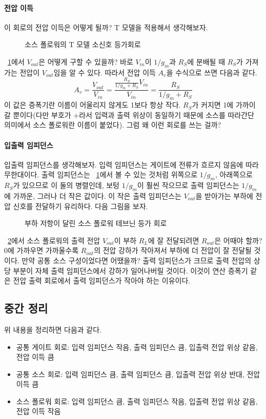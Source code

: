 \paragraph{전압 이득}
이 회로의 전압 이득은 어떻게 될까? T 모델을 적용해서 생각해보자.
\begin{figure}[!hbp]
    \centering
    \caption{소스 폴로워의 T 모델 소신호 등가회로}\label{fig:src follower eq circuit}
\end{figure}
\figurename~\ref{fig:src follower eq circuit}에서 $V_{out}$은 어떻게 구할 수 있을까? 바로 $V_{in}$이 $1/g_m$과 $R_S$에 분배될 때 $R_S$가 가져가는 전압이 $V_{out}$임을 알 수 있다.
따라서 전압 이득 $A_v$을 수식으로 쓰면 다음과 같다.
\begin{equation}
    A_v=\frac{V_{out}}{V_{in}}=\frac{\frac{R_S}{1/g_m+R_S}V_{in}}{V_{in}}=\frac{R_S}{1/g_m+R_S}
\end{equation}
이 값은 증폭기란 이름이 어울리지 않게도 1보다 항상 작다. $R_S$가 커지면 1에 가까이 갈 뿐이다(다만 부호가 +라서 입력과 출력 위상이 동일하기 때문에 소스를 따라간단 의미에서 소스 폴로워란 이름이 붙었다).
그럼 왜 이런 회로를 쓰는 걸까?
\paragraph{입출력 임피던스}
입출력 임피던스를 생각해보자. 입력 임피던스는 게이트에 전류가 흐르지 않음에 따라 무한대이다. 출력 임피던스는 \figurename~\ref{fig:src follower eq circuit}에서 볼 수 있는 것처럼 위쪽으로 $1/g_m$, 아래쪽으로 $R_S$가 있으므로 이 둘의 병렬인데, 보텅 $1/g_m$이 훨씬 작으므로 출력 임피던스는 $1/g_m$에 가까운, 그러나 더 작은 값이다.
이 작은 출력 임피던스는 $V_{out}$을 받아가는 부하에 전압 신호를 전달하기 유리하다. 다음 그림을 보자.
\begin{figure}[!hbp]
    \centering
    \caption{부하 저항이 달린 소스 폴로워 테브닌 등가 회로}\label{fig:src follower Thevnin eq circuit}
\end{figure}
\figurename~\ref{fig:src follower Thevnin eq circuit}에서 소스 폴로워의 출력 전압 $V_{out}$이 부하 $R_L$에 잘 전달되려면 $R_{out}$은 어때야 할까? 0에 가까우면 가까울수록 $R_{out}$의 전압 강하가 작아져서 부하에 더 전압이 잘 전달될 것이다.
만약 공통 소스 구성이었다면 어땠을까? 출력 임피던스가 크므로 출력 전압의 상당 부분이 자체 출력 임피던스에서 강하가 일어나버릴 것이다.
이것이 연산 증폭기 같은 전압 출력 회로에서 출력 임피던스가 작아야 하는 이유이다.

\subsection{중간 정리}
위 내용을 정리하면 다음과 같다.
\begin{itemize}
    \item 공통 게이트 회로: 입력 임피던스 작음, 출력 임피던스 큼, 입출력 전압 위상 같음, 전압 이득 큼
    \item 공통 소스 회로: 입력 임피던스 큼, 출력 임피던스 큼, 입출력 전압 위상 반대, 전압 이득 큼
    \item 소스 폴로워 회로: 입력 임피던스 큼, 출력 임피던스 작음, 입출력 전압 위상 같음, 전압 이득 작음
\end{itemize}

